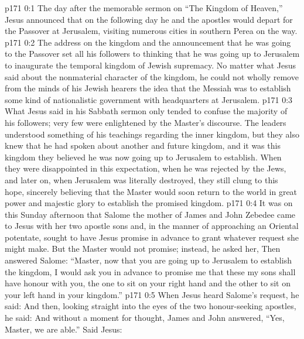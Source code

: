 \author{Midwayer Commission}
\vs p171 0:1 The day after the memorable sermon on “The Kingdom of Heaven,” Jesus announced that on the following day he and the apostles would depart for the Passover at Jerusalem, visiting numerous cities in southern Perea on the way.
\vs p171 0:2 The address on the kingdom and the announcement that he was going to the Passover set all his followers to thinking that he was going up to Jerusalem to inaugurate the temporal kingdom of Jewish supremacy. No matter what Jesus said about the nonmaterial character of the kingdom, he could not wholly remove from the minds of his Jewish hearers the idea that the Messiah was to establish some kind of nationalistic government with headquarters at Jerusalem.
\vs p171 0:3 What Jesus said in his Sabbath sermon only tended to confuse the majority of his followers; very few were enlightened by the Master’s discourse. The leaders understood something of his teachings regarding the inner kingdom,  but they also knew that he had spoken about another and future kingdom, and it was this kingdom they believed he was now going up to Jerusalem to establish. When they were disappointed in this expectation, when he was rejected by the Jews, and later on, when Jerusalem was literally destroyed, they still clung to this hope, sincerely believing that the Master would soon return to the world in great power and majestic glory to establish the promised kingdom.
\vs p171 0:4 \pc It was on this Sunday afternoon that Salome the mother of James and John Zebedee came to Jesus with her two apostle sons and, in the manner of approaching an Oriental potentate, sought to have Jesus promise in advance to grant whatever request she might make. But the Master would not promise; instead, he asked her,  Then answered Salome: “Master, now that you are going up to Jerusalem to establish the kingdom, I would ask you in advance to promise me that these my sons shall have honour with you, the one to sit on your right hand and the other to sit on your left hand in your kingdom.”
\vs p171 0:5 When Jesus heard Salome’s request, he said:  And then, looking straight into the eyes of the two honour\hyp{}seeking apostles, he said:  And without a moment for thought, James and John answered, “Yes, Master, we are able.” Said Jesus: 
